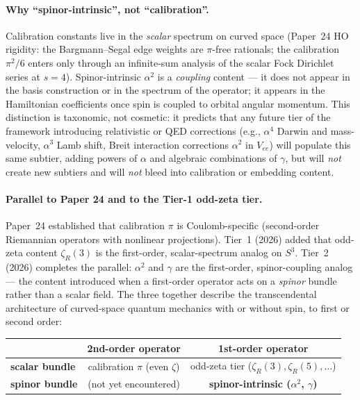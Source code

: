 \paragraph{Why ``spinor-intrinsic'', not ``calibration''.}
Calibration constants live in the \emph{scalar} spectrum on curved
space (Paper~24 HO rigidity: the Bargmann--Segal edge weights are
$\pi$-free rationals; the calibration $\pi^2/6$ enters only through an
infinite-sum analysis of the scalar Fock Dirichlet series at $s = 4$).
Spinor-intrinsic $\alpha^2$ is a \emph{coupling} content --- it does
not appear in the basis construction or in the spectrum of the
operator; it appears in the Hamiltonian coefficients once spin is
coupled to orbital angular momentum. This distinction is taxonomic, not
cosmetic: it predicts that any future tier of the framework introducing
relativistic or QED corrections (e.g., $\alpha^4$ Darwin and
mass-velocity, $\alpha^3$ Lamb shift, Breit interaction
corrections $\alpha^2$ in $V_{ee}$) will populate this same subtier,
adding powers of $\alpha$ and algebraic combinations of $\gamma$, but
will \emph{not} create new subtiers and will \emph{not} bleed into
calibration or embedding content.

\paragraph{Parallel to Paper 24 and to the Tier-1 odd-zeta tier.}
Paper~24 established that calibration $\pi$ is Coulomb-specific
(second-order Riemannian operators with nonlinear projections). Tier~1
(2026) added that odd-zeta content $\zeta_R(3)$ is the first-order,
scalar-spectrum analog on $S^3$. Tier~2 (2026) completes the parallel:
$\alpha^2$ and $\gamma$ are the first-order, spinor-coupling analog ---
the content introduced when a first-order operator acts on a \emph{spinor}
bundle rather than a scalar field. The three together describe the
transcendental architecture of curved-space quantum mechanics with or
without spin, to first or second order:

\begin{center}
\begin{tabular}{l|cc}
  & \textbf{2nd-order operator} & \textbf{1st-order operator} \\
  \hline
  \textbf{scalar bundle}  & calibration $\pi$ (even $\zeta$)
                          & odd-zeta tier ($\zeta_R(3), \zeta_R(5), \dots$) \\
  \textbf{spinor bundle}  & (not yet encountered)
                          & \textbf{spinor-intrinsic ($\alpha^2$, $\gamma$)} \\
\end{tabular}
\end{center}

